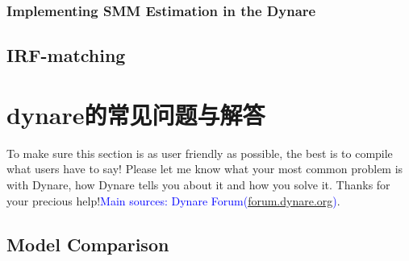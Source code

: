 \documentclass[cn,10pt,math=newtx,citestyle=gb7714-2015,bibstyle=gb7714-2015]{elegantbook}
\begin{document}
{{	\subsection{Implementing SMM Estimation in the Dynare}
	
	
	
	
	\section{IRF-matching}
	
	
	
	\nocite{*} 
	\printbibliography
	\appendix
	
	\chapter{dynare的常见问题与解答}
	
	To make sure this section is as user friendly as possible, the best is to compile what users have to say! Please let me know what your most common problem is with Dynare, how Dynare tells you about it and how you solve it. Thanks for your precious help!\textcolor{blue}{Main sources: Dynare Forum(\url{forum.dynare.org})}.
	
	\section{Model Comparison}
	
}}
\end{document}
